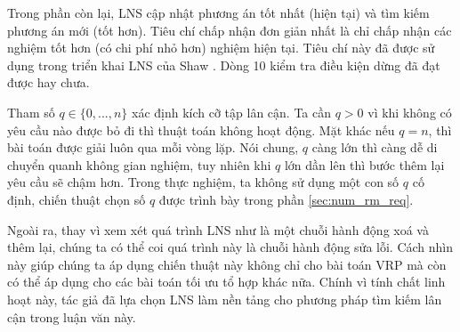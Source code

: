 Trong phần còn lại, LNS cập nhật phương án tốt nhất (hiện tại) và tìm kiếm phương án mới (tốt hơn). Tiêu chí chấp nhận đơn giản nhất là chỉ chấp nhận các nghiệm tốt hơn (có chi phí nhỏ hơn) nghiệm hiện tại. Tiêu chí này đã được sử dụng trong triển khai LNS của Shaw \cite{shaw1997new}. Dòng 10 kiểm tra điều kiện dừng đã đạt được hay chưa.

Tham số $q \in \{0,...,n\}$ xác định kích cỡ tập lân cận. Ta cần $q > 0$ vì khi không có yêu cầu nào được bỏ đi thì thuật toán không hoạt động. Mặt khác nếu $q = n$, thì bài toán được giải luôn qua mỗi vòng lặp. Nói chung, $q$ càng lớn thì càng dễ di chuyển quanh không gian nghiệm, tuy nhiên khi $q$ lớn dần lên thì bước thêm lại yêu cầu sẽ chậm hơn. Trong thực nghiệm, ta không sử dụng một con số $q$ cố định, chiến thuật chọn số $q$ được trình bày trong phần \ref{sec:num_rm_req}.

Ngoài ra, thay vì xem xét quá trình LNS như là một chuỗi hành động xoá và thêm lại, chúng ta có thể coi quá trình này là chuỗi hành động sửa lỗi. Cách nhìn này giúp chúng ta áp dụng chiến thuật này không chỉ cho bài toán VRP mà còn có thể áp dụng cho các bài toán tối ưu tổ hợp khác nữa. Chính vì tính chất linh hoạt này, tác giả đã lựa chọn LNS làm nền tảng cho phương pháp tìm kiếm lân cận trong luận văn này.



